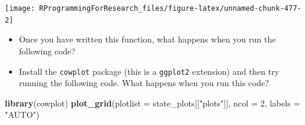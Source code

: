 \documentclass[]{book}
\makeatletter
\newenvironment{Shaded}{\begin{snugshade}}{\end{snugshade}}
\newcommand{\KeywordTok}[1]{\textcolor[rgb]{0.13,0.29,0.53}{\textbf{#1}}}
\newcommand{\DataTypeTok}[1]{\textcolor[rgb]{0.13,0.29,0.53}{#1}}
\newcommand{\DecValTok}[1]{\textcolor[rgb]{0.00,0.00,0.81}{#1}}
\newcommand{\StringTok}[1]{\textcolor[rgb]{0.31,0.60,0.02}{#1}}
\newcommand{\OperatorTok}[1]{\textcolor[rgb]{0.81,0.36,0.00}{\textbf{#1}}}
\newcommand{\NormalTok}[1]{#1}
\providecommand{\tightlist}{%
  \setlength{\itemsep}{0pt}\setlength{\parskip}{0pt}}
\newenvironment{kframe}{%
\medskip{}
\setlength{\fboxsep}{.8em}
 \def\at@end@of@kframe{}%
 \ifinner\ifhmode%
  \def\at@end@of@kframe{\end{minipage}}%
  \begin{minipage}{\columnwidth}%
 \fi\fi%
 \def\FrameCommand##1{\hskip\@totalleftmargin \hskip-\fboxsep
 \colorbox{shadecolor}{##1}\hskip-\fboxsep
     \hskip-\linewidth \hskip-\@totalleftmargin \hskip\columnwidth}%
 \MakeFramed {\advance\hsize-\width
   \@totalleftmargin\z@ \linewidth\hsize
   \@setminipage}}%
 {\par\unskip\endMakeFramed%
 \at@end@of@kframe}
\renewenvironment{Shaded}{\begin{kframe}}{\end{kframe}}
\theoremstyle{definition}
\theoremstyle{definition}
\theoremstyle{definition}
\theoremstyle{remark}
\makeatother
\begin{document}
\begin{center}\texttt{[image: RProgrammingForResearch\_files/figure-latex/unnamed-chunk-477-2]} \end{center}

\begin{itemize}
\tightlist
\item
  Once you have written this function, what happens when you run the
  following code?
\end{itemize}

\begin{Shaded}
\end{Shaded}

\begin{itemize}
\tightlist
\item
  Install the \texttt{cowplot} package (this is a \texttt{ggplot2}
  extension) and then try running the following code. What happens when
  you run this code?
\end{itemize}

\begin{Shaded}
\begin{Highlighting}[]
\KeywordTok{library}\NormalTok{(cowplot)}
\KeywordTok{plot_grid}\NormalTok{(}\DataTypeTok{plotlist =}\NormalTok{ state_plots[[}\StringTok{"plots"}\NormalTok{]], }
          \DataTypeTok{ncol =} \DecValTok{2}\NormalTok{, }\DataTypeTok{labels =} \StringTok{"AUTO"}\NormalTok{)}
\end{Highlighting}
\end{Shaded}
\end{document}
